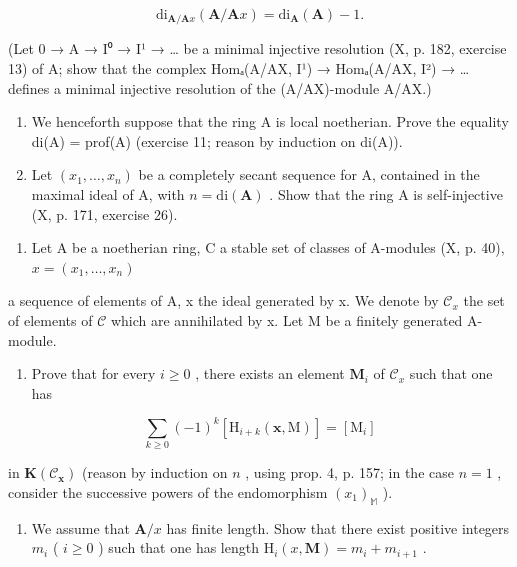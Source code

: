 \[
\mathrm{di} _ {\mathbf {A} / \mathbf {A} x} (\mathbf {A} / \mathbf {A} x) = \mathrm{di} _ {\mathbf {A}} (\mathbf {A}) - 1.
\]

(Let 0 → A → I⁰ → I¹ → \ldots{} be a minimal injective resolution (X, p. 182, exercise 13) of A; show that the complex Homₐ(A/AX, I¹) → Homₐ(A/AX, I²) → \ldots{} defines a minimal injective resolution of the (A/AX)-module A/AX.)

\begin{enumerate}
\def\labelenumi{\alph{enumi})}
\setcounter{enumi}{1}
\item
  We henceforth suppose that the ring A is local noetherian. Prove the equality di(A) = prof(A) (exercise 11; reason by induction on di(A)).
\item
  Let \((x_{1},\ldots ,x_{n})\) be a completely secant sequence for A, contained in the maximal ideal of A, with \(n = \mathrm{di}(\mathbf{A})\) . Show that the ring A is self-injective (X, p. 171, exercise 26).
\end{enumerate}

\begin{enumerate}
\def\labelenumi{\arabic{enumi})}
\setcounter{enumi}{17}
\tightlist
\item
  Let A be a noetherian ring, C a stable set of classes of A-modules (X, p. 40), \(x = (x_{1}, \ldots, x_{n})\)
\end{enumerate}

a sequence of elements of A, x the ideal generated by x. We denote by \(\mathcal{C}_{x}\) the set of elements of \(\mathcal{C}\) which are annihilated by x. Let M be a finitely generated A-module.

\begin{enumerate}
\def\labelenumi{\alph{enumi})}
\tightlist
\item
  Prove that for every \(i \geqslant 0\) , there exists an element \(\mathbf{M}_{i}\) of \(\mathcal{C}_{x}\) such that one has
\end{enumerate}

\[
\sum_ {k \geqslant 0} (- 1) ^ {k} \left[ \mathrm{H} _ {i + k} (\mathbf {x}, \mathrm{M}) \right] = [ \mathrm{M} _ {i} ]
\]

in \(\mathbf{K}(\mathcal{C}_{\pmb{x}})\) (reason by induction on \(n\) , using prop. 4, p. 157; in the case \(n = 1\) , consider the successive powers of the endomorphism \((x_{1})_{\mathbb{M}}\) ).

\begin{enumerate}
\def\labelenumi{\alph{enumi})}
\setcounter{enumi}{1}
\tightlist
\item
  We assume that \(\mathbf{A} / x\) has finite length. Show that there exist positive integers \(m_{i}\) ( \(i \geqslant 0\) ) such that one has length \(\mathrm{H}_{i}(x, \mathbf{M}) = m_{i} + m_{i+1}\) .
\end{enumerate}

